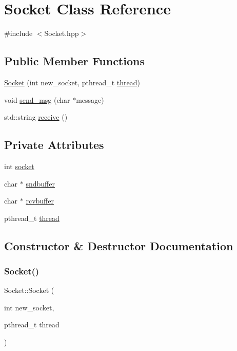 \hypertarget{class_socket}{}\section{Socket Class Reference}
\label{class_socket}


{\ttfamily \#include $<$Socket.\+hpp$>$}

\subsection*{Public Member Functions}
\begin{DoxyCompactItemize}
\item 
\mbox{\hyperlink{class_socket_afbf6825e4819e8cbcfdb3e3d083cad34}{Socket}} (int new\+\_\+socket, pthread\+\_\+t \mbox{\hyperlink{class_socket_a3f257ff5ebfc3431b8a33879a806bb06}{thread}})
\item 
void \mbox{\hyperlink{class_socket_a39eaf88b49360805f252506d301cf1c4}{send\+\_\+msg}} (char $\ast$message)
\item 
std\+::string \mbox{\hyperlink{class_socket_a93675446d84c9856a4d7493f99d1e064}{receive}} ()
\end{DoxyCompactItemize}
\subsection*{Private Attributes}
\begin{DoxyCompactItemize}
\item 
int \mbox{\hyperlink{class_socket_ad514f7c19bf905d2618222aafd2ad65c}{socket}}
\item 
char $\ast$ \mbox{\hyperlink{class_socket_a08722f899fe7248e6bd122f5c241872b}{sndbuffer}}
\item 
char $\ast$ \mbox{\hyperlink{class_socket_af6c5600b809c80996f76a5fb143af4e8}{rcvbuffer}}
\item 
pthread\+\_\+t \mbox{\hyperlink{class_socket_a3f257ff5ebfc3431b8a33879a806bb06}{thread}}
\end{DoxyCompactItemize}


\subsection{Constructor \& Destructor Documentation}
\mbox{\label{class_socket_afbf6825e4819e8cbcfdb3e3d083cad34}} 
\subsubsection{\texorpdfstring{Socket()}{Socket()}}
{\footnotesize\ttfamily Socket\+::\+Socket (\begin{DoxyParamCaption}\item[{int}]{new\+\_\+socket,  }\item[{pthread\+\_\+t}]{thread }\end{DoxyParamCaption})}



